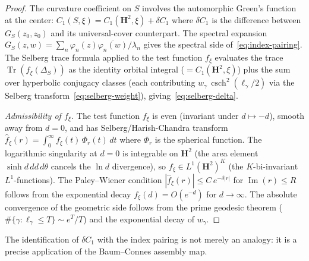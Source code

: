 \begin{proof}
The curvature coefficient on $S$ involves the automorphic
Green's function at the center:
$C_1(S, \xi) = C_1(\mathbf{H}^2, \xi) + \delta C_1$
where $\delta C_1$ is the difference between $G_S(z_0, z_0)$
and its universal-cover counterpart.
The spectral expansion
$G_S(z,w) = \sum_n \varphi_n(z)\overline{\varphi_n(w)}/\lambda_n$
gives the spectral side of~\eqref{eq:index-pairing}.
The Selberg trace formula \citep{Hejhal1976}
applied to the test function $f_\xi$
evaluates the trace $\operatorname{Tr}(f_\xi(\Delta_S))$ as
the identity orbital integral ($= C_1(\mathbf{H}^2, \xi)$)
plus the sum over hyperbolic conjugacy classes
(each contributing $w_\gamma\,\operatorname{csch}^2(\ell_\gamma/2)$
via the Selberg transform~\eqref{eq:selberg-weight}),
giving~\eqref{eq:selberg-delta}.

\emph{Admissibility of $f_\xi$.}
The test function $f_\xi$ is even (invariant under
$d \mapsto -d$), smooth away from $d = 0$, and has
Selberg/Harish-Chandra transform $\hat{f}_\xi(r) =
\int_0^\infty f_\xi(t)\,\Phi_r(t)\,dt$ where
$\Phi_r$ is the spherical function.
The logarithmic singularity at $d = 0$ is integrable
on $\mathbf{H}^2$ (the area element $\sinh d\,dd\,d\theta$
cancels the $\ln d$ divergence), so
$f_\xi \in L^1(\mathbf{H}^2)^{K}$ (the $K$-bi-invariant
$L^1$-functions).  The Paley--Wiener condition
$|\hat{f}_\xi(r)| \le C\,e^{-\delta|r|}$ for
$\operatorname{Im}(r) \le R$ follows from the exponential
decay $f_\xi(d) = O(e^{-d})$ for $d \to \infty$.
The absolute convergence of the geometric side follows
from the prime geodesic theorem
($\#\{\gamma : \ell_\gamma \le T\} \sim e^T / T$) and the
exponential decay of $w_\gamma$.
\end{proof}

The identification of $\delta C_1$ with the index pairing is not
merely an analogy: it is a precise application of the Baum--Connes
assembly map.

